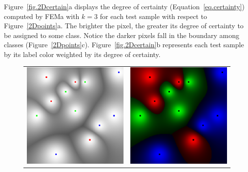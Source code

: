 Figure~\ref{fig.2Dcertain}a displays the degree of certainty (Equation~\ref{eq.certainty}) computed by FEMa with $k=3$ for each test sample with respect to Figure~\ref{2Dpoints}a. The brighter the pixel, the greater its degree of certainty to be assigned to some class. Notice the darker pixels fall in the boundary among classes (Figure~\ref{2Dpoints}c). Figure~\ref{fig.2Dcertain}b represents each test sample by its label color weighted by its degree of certainty.

\begin{figure}[!htb]
\centering
\begin{tabular}{cc}
 \includegraphics[scale=0.5]{./certain_p.eps} &
 \includegraphics[scale=0.5]{./out_w_p.eps} \\

\end{tabular}
\end{figure}
